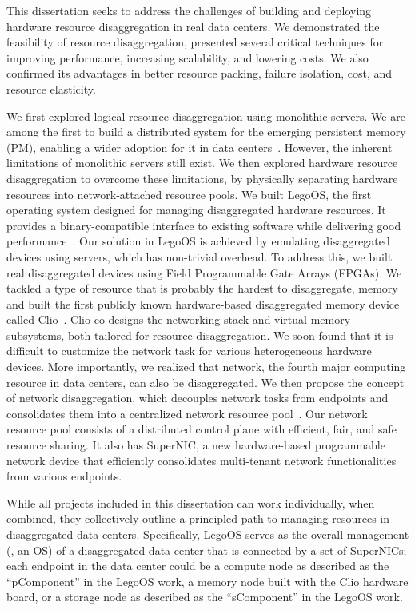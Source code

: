 This dissertation seeks to address the challenges of building and deploying
hardware resource disaggregation in real data centers.
We demonstrated the feasibility of resource disaggregation, 
presented several critical techniques for
improving performance, increasing scalability, and lowering costs.
We also confirmed its advantages in better resource packing, failure isolation, cost, and resource elasticity.

We first explored logical resource disaggregation using monolithic servers.
We are among the first to build a distributed system for the emerging persistent memory (PM),
enabling a wider adoption for it in data centers~\cite{Shan17-SOCC}.
However, the inherent limitations of monolithic servers still exist.
%
We then explored hardware resource disaggregation
to overcome these limitations,
by physically separating hardware resources into network-attached resource pools.
We built LegoOS, the first operating system designed for managing disaggregated hardware resources.
It provides a binary-compatible interface to existing software while delivering good performance~\cite{Shan18-OSDI}.
%
Our solution in LegoOS is achieved by emulating disaggregated devices using servers,
which has non-trivial overhead.
To address this, we built real disaggregated devices using Field Programmable Gate Arrays (FPGAs).
We tackled a type of resource that is probably the hardest to disaggregate,
memory and built the first publicly known hardware-based disaggregated
memory device called Clio~\cite{clio-arxiv}.
Clio co-designs the networking stack and virtual memory subsystems, both tailored for resource disaggregation.
%
We soon found that it is difficult to customize the 
network task for various heterogeneous hardware devices.
More importantly, we realized that network, the fourth major computing resource in data centers, can also be disaggregated.
We then propose the concept of network disaggregation,
which decouples network tasks from endpoints and consolidates them into a centralized network resource pool~\cite{supernic-axiv}.
Our network resource pool consists of a distributed control plane with efficient, fair, and safe resource
sharing.
It also has SuperNIC, a new hardware-based programmable network device that
efficiently consolidates multi-tenant network functionalities from various endpoints.

While all projects included in this dissertation can work individually, 
when combined, they collectively outline
a principled path to managing resources in disaggregated data centers.
Specifically, LegoOS serves as the overall management (\ie, an OS) of a disaggregated data center that is connected by a set of SuperNICs; each endpoint in the data center could be a compute node as described as the ``pComponent'' in the LegoOS work, a memory node built with the Clio hardware board, or a storage node as described as the ``sComponent'' in the LegoOS work.

